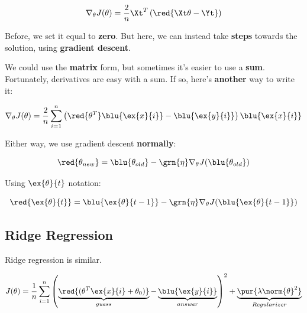         \begin{equation}
            \nabla_\theta J(\theta) = 
                \frac{2}{n} \Xt^T
                \left( \red{ \Xt \theta  - \Yt } \right) 
        \end{equation}
        
        Before, we set it equal to \textbf{zero}. But here, we can instead take \textbf{steps} towards the solution, using \textbf{gradient descent}.
        
        We could use the \textbf{matrix} form, but sometimes it's easier to use a \textbf{sum}. Fortunately, derivatives are easy with a sum. If so, here's \textbf{another} way to write it:
        
        \begin{equation}
            \nabla_\theta J(\theta) 
            = 
            \frac{2}{n} \sum_{i=1}^n
            \left(
                \red{\theta^T} \blu{\ex{x}{i}} - \blu{\ex{y}{i}}
            \right)
            \blu{\ex{x}{i}}
        \end{equation}
        
        Either way, we use gradient descent \textbf{normally}:
        
        \begin{equation*}
            \red{ \theta_{new} } 
            =  
            \blu{ \theta_{old} } 
            - \grn{ \eta } 
            \nabla_\theta J ( \blu{ \theta_{old} } )
        \end{equation*}
        
        Using $\ex{\theta}{t}$ notation:
        
        \begin{equation*}
            \red{ \ex{\theta}{t} } = 
            \blu{ \ex{\theta}{t-1} } -
            \grn{\eta} \nabla_\theta J ( \blu{ \ex{\theta}{t-1} })
        \end{equation*}
        
    \subsection{Ridge Regression}
    
        Ridge regression is similar. 
        
        \begin{equation*}
                J(\theta) 
                = 
                \frac{1}{n}  \sum_{i=1}^n 
                \left( 
                    \underbrace{
                        \red{(\theta^T \ex{x}{i}  
                        + \theta_0)}
                    }_{guess}
                    - \underbrace{
                        \blu{\ex{y}{i}} 
                    }_{answer}
                \right)^2 
                + 
                \underbrace{
                    \pur{ \lambda \norm{\theta}^2 }
                }_{Regularizer}
            \end{equation*}
        
